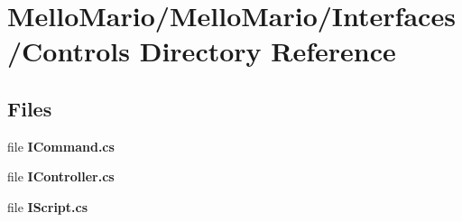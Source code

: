 \section{Mello\+Mario/\+Mello\+Mario/\+Interfaces/\+Controls Directory Reference}
\label{dir_1c855d998a72da801e3ad689658f2c70}
\subsection*{Files}
\begin{DoxyCompactItemize}
\item 
file \textbf{ I\+Command.\+cs}
\item 
file \textbf{ I\+Controller.\+cs}
\item 
file \textbf{ I\+Script.\+cs}
\end{DoxyCompactItemize}
